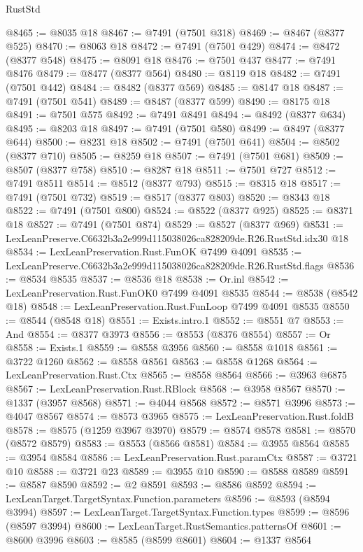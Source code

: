 \begin{lexlean}{RustStd}
\begin{coremodule}
@8465 := @8035 @18
@8467 := @7491 (@7501 @318)
@8469 := @8467 (@8377 @525)
@8470 := @8063 @18
@8472 := @7491 (@7501 @429)
@8474 := @8472 (@8377 @548)
@8475 := @8091 @18
@8476 := @7501 @437
@8477 := @7491 @8476
@8479 := @8477 (@8377 @564)
@8480 := @8119 @18
@8482 := @7491 (@7501 @442)
@8484 := @8482 (@8377 @569)
@8485 := @8147 @18
@8487 := @7491 (@7501 @541)
@8489 := @8487 (@8377 @599)
@8490 := @8175 @18
@8491 := @7501 @575
@8492 := @7491 @8491
@8494 := @8492 (@8377 @634)
@8495 := @8203 @18
@8497 := @7491 (@7501 @580)
@8499 := @8497 (@8377 @644)
@8500 := @8231 @18
@8502 := @7491 (@7501 @641)
@8504 := @8502 (@8377 @710)
@8505 := @8259 @18
@8507 := @7491 (@7501 @681)
@8509 := @8507 (@8377 @758)
@8510 := @8287 @18
@8511 := @7501 @727
@8512 := @7491 @8511
@8514 := @8512 (@8377 @793)
@8515 := @8315 @18
@8517 := @7491 (@7501 @732)
@8519 := @8517 (@8377 @803)
@8520 := @8343 @18
@8522 := @7491 (@7501 @800)
@8524 := @8522 (@8377 @925)
@8525 := @8371 @18
@8527 := @7491 (@7501 @874)
@8529 := @8527 (@8377 @969)
@8531 := LexLeanPreserve.C6632b3a2e999d115038026ca828209de.R26.RustStd.idx30 @18
@8534 := LexLeanPreservation.Rust.FunOK @7499 @4091
@8535 := LexLeanPreserve.C6632b3a2e999d115038026ca828209de.R26.RustStd.flags
@8536 := @8534 @8535
@8537 := @8536 @18
@8538 := Or.inl
@8542 := LexLeanPreservation.Rust.FunOK0 @7499 @4091 @8535
@8544 := @8538 (@8542 @18)
@8548 := LexLeanPreservation.Rust.FunLoop @7499 @4091 @8535
@8550 := @8544 (@8548 @18)
@8551 := Exists.intro.{1}
@8552 := @8551 @7
@8553 := And
@8554 := @8377 @3973
@8556 := @8553 (@8376 @8554)
@8557 := Or
@8558 := Exists.{1}
@8559 := @8558 @3956
@8560 := @8558 @1018
@8561 := @3722 @1260
@8562 := @8558 @8561
@8563 := @8558 @1268
@8564 := LexLeanPreservation.Rust.Ctx
@8565 := @8558 @8564
@8566 := @3963 @6875
@8567 := LexLeanPreservation.Rust.RBlock
@8568 := @3958 @8567
@8570 := @1337 (@3957 @8568)
@8571 := @4044 @8568
@8572 := @8571 @3996
@8573 := @4047 @8567
@8574 := @8573 @3965
@8575 := LexLeanPreservation.Rust.foldB
@8578 := @8575 (@1259 @3967 @3970)
@8579 := @8574 @8578
@8581 := @8570 (@8572 @8579)
@8583 := @8553 (@8566 @8581)
@8584 := @3955 @8564
@8585 := @3954 @8584
@8586 := LexLeanPreservation.Rust.paramCtx
@8587 := @3721 @10
@8588 := @3721 @23
@8589 := @3955 @10
@8590 := @8588 @8589
@8591 := @8587 @8590
@8592 := @2 @8591
@8593 := @8586 @8592
@8594 := LexLeanTarget.TargetSyntax.Function.parameters
@8596 := @8593 (@8594 @3994)
@8597 := LexLeanTarget.TargetSyntax.Function.types
@8599 := @8596 (@8597 @3994)
@8600 := LexLeanTarget.RustSemantics.patternsOf
@8601 := @8600 @3996
@8603 := @8585 (@8599 @8601)
@8604 := @1337 @8564

\end{coremodule}
\end{lexlean}
